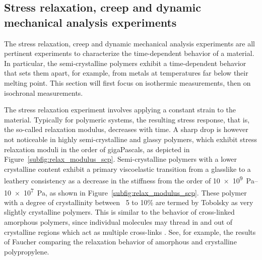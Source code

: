 \subsection{Stress relaxation, creep  and dynamic mechanical analysis experiments}
\label{sec:relax_creep_dma}

The stress relaxation, creep and dynamic mechanical analysis experiments are all pertinent experiments to characterize the time-dependent behavior of a material.
In particular, the semi-crystalline polymers exhibit a time-dependent behavior that sets them apart, for example, from metals at temperatures far below their melting point.
This section will first focus on isothermic measurements, then on isochronal measurements.

The stress relaxation experiment involves applying a constant strain to the material.
Typically for polymeric systems, the resulting stress response, that is, the so-called relaxation modulus, decreases with time.
A sharp drop is however not noticeable in highly semi-crystalline and glassy polymers, which exhibit stress relaxation moduli in the order of gigaPascals, as depicted in Figure~\ref{subfig:relax_modulus_scp}.
Semi-crystalline polymers with a lower crystalline content exhibit a primary viscoelastic transition from a glasslike to a leathery consistency as a decrease in the stiffness from the order of \SIrange{10e9}{10e7}{\pascal}, as shown in Figure~\ref{subfig:relax_modulus_scp}.
These polymer with a degree of crystallinity between ~5 to 10\% are termed by Tobolsky \citep{tobolskyPropertiesStructurePolymers1960} as very slightly crystalline polymers.
This is similar to the behavior of cross-linked amorphous polymers, since individual molecules may thread in and out of crystalline regions which act as multiple cross-links \citep{ferryViscoelasticPropertiesPolymers1980, gsellYieldTransientEffects1981}.
See, for example, the results of Faucher \citep{faucherViscoelasticBehaviorPolyethylene1959} comparing the relaxation behavior of amorphous and crystalline polypropylene.


